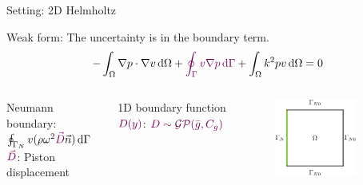 \documentclass[fleqn,11pt,aspectratio=43]{beamer}
\begin{document}
\begin{frame}{Setting: 2D Helmholtz}
\begin{block}{Weak form:}
The \textcolor{DGTU}{uncertainty} is in the boundary term.
\begin{equation}
-\int_{\Omega} \nabla p \cdot \nabla v \,\mathrm{d}\Omega + \textcolor{DGTU}{\oint_{\Gamma} v \nabla p  \,\mathrm{d}\Gamma}+ \int_{\Omega} k^2 pv \,\mathrm{d}\Omega = 0
\label{eqn:WeakHelmholtz}
\end{equation}
\end{block}

\begin{columns}[onlytextwidth]
    \begin{block}{Neumann boundary:}
      $\oint_{\Gamma_N} v (\rho \omega^2 \textcolor{DGTU}{\vec{D}}\vec{n})  \,\mathrm{d}\Gamma$\\
      $\textcolor{DGTU}{\vec{D}}$: Piston displacement
          \end{block}
          1D boundary function $\textcolor{DGTU}{D(y)}$: $\textcolor{DGTU}{D \sim \mathcal{GP}(\bar{g}, C_g)}$
      	\begin{figure}[h]
		\begin{center}
		\includegraphics[width=0.8\textwidth]{BCsThesis1}
		\end{center}
		\end{figure}
  \end{columns}
\end{frame}
\end{document}
